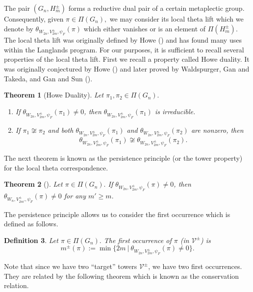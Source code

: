 \documentclass[11pt,letterpaper]{amsart}
\newtheorem{thm}{Theorem}[section]
\newtheorem{defn}[thm]{Definition}
\numberwithin{equation}{section}
\begin{document}
The pair $(G_n,H_m^\pm)$ forms a reductive dual pair of a certain metaplectic group. Consequently, given $\pi\in\Pi(G_n),$ we may consider its local theta lift which we denote by $\theta_{W_{2n},V_{2m}^\pm,\psi_F}(\pi)$ which either vanishes or is an element of $\Pi(H_m^\pm)$. The local theta lift was originally defined by Howe (\cite{How89}) and has found many uses within the Langlands program. For our purposes, it is sufficient to recall several properties of the local theta lift.
First we recall a property called Howe duality. It was originally conjectured by Howe (\cite{How79}) and later proved by Waldspurger, Gan and Takeda, and Gan and Sun (\cite{GS17, GT16, Wal90}).

\begin{thm}[Howe Duality]\label{thm Howe duality} 
Let $\pi_1,\pi_2\in\Pi(G_n).$
\begin{enumerate}
    \item If $\theta_{W_{2n},V_{2m}^\pm,\psi_F}(\pi_1)\neq 0$, then $\theta_{W_{2n},V_{2m}^\pm,\psi_F}(\pi_1)$ is irreducible.
    \item If $\pi_1\not\cong\pi_2$ and both $\theta_{W_{2n},V_{2m}^\pm,\psi_F}(\pi_1)$ and $\theta_{W_{2n},V_{2m}^\pm,\psi_F}(\pi_2)$ are nonzero, then \[\theta_{W_{2n},V_{2m}^\pm,\psi_F}(\pi_1)\not\cong \theta_{W_{2n},V_{2m}^\pm,\psi_F}(\pi_2).\]
\end{enumerate}
\end{thm}
The next theorem is known as the persistence principle (or the tower property) for the local theta correspondence.
\begin{thm}[{\cite{Kud86}}]\label{thm persistence principle}
Let $\pi\in\Pi(G_n).$ If $\theta_{W_{2n},V_{2m}^\pm,\psi_F}(\pi)\neq 0$, then $\theta_{W_n,V_{2m'}^\pm,\psi_F}(\pi)\neq 0$ for any $m'\geq m.$
\end{thm}

The persistence principle allows us to consider the first occurrence which is defined as follows. 

\begin{defn}\label{def first occurence}
    Let $\pi\in\Pi(G_n).$ The \emph{first occurrence} of $\pi$ (in $\mathcal{V}^\pm$) is
    \[
    m^{\pm}(\pi):=\min\{2m \ | \ \theta_{W_{2n},V_{2m}^\pm,\psi_F}(\pi)\neq 0\}.
    \]
\end{defn}

Note that since we have two ``target'' towers $\mathcal{V}^\pm$, we have two first occurrences. They are related by the following theorem which is known as the conservation relation.
\end{document}
